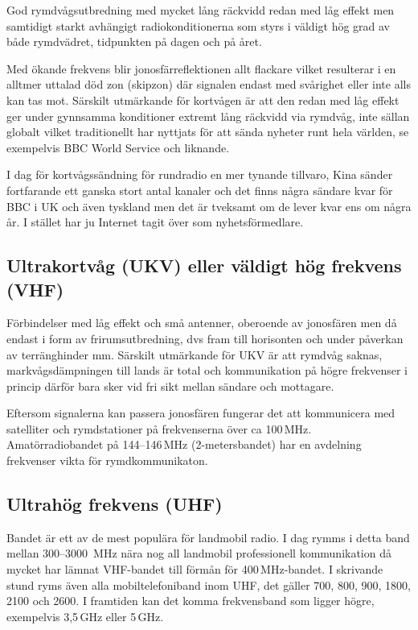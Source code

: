 God rymdvågsutbredning med mycket lång räckvidd redan med låg effekt men
samtidigt starkt avhängigt radiokonditionerna som styrs i väldigt hög grad av
både rymdvädret, tidpunkten på dagen och på året.

Med ökande frekvens blir jonosfärreflektionen allt flackare vilket resulterar
i en alltmer uttalad död zon (skipzon) där signalen endast med svårighet eller
inte alls kan tas mot. Särskilt utmärkande för kortvågen är att den redan med
låg effekt ger under gynnsamma konditioner extremt lång räckvidd via rymdvåg,
inte sällan globalt vilket traditionellt har nyttjats för att sända nyheter
runt hela världen, se exempelvis BBC World Service och liknande.

I dag för kortvågssändning för rundradio en mer tynande tillvaro, Kina sänder
fortfarande ett ganska stort antal kanaler och det finns några sändare kvar
för BBC i UK och även tyskland men det är tveksamt om de lever kvar ens om
några år. I stället har ju Internet tagit över som nyhetsförmedlare.

\subsection{Ultrakortvåg (UKV) eller väldigt hög frekvens (VHF)}

Förbindelser med låg effekt och små antenner, oberoende av jonosfären men då
endast i form av frirumsutbredning, dvs fram till horisonten och under
påverkan av terränghinder mm. Särskilt utmärkande för UKV är att rymdvåg
saknas, markvågsdämpningen till lands är total och kommunikation på högre
frekvenser i princip därför bara sker vid fri sikt mellan sändare och
mottagare.

Eftersom signalerna kan passera jonosfären fungerar det att kommunicera med
satelliter och rymdstationer på frekvenserna över ca 100\,MHz.
Amatörradiobandet på 144--146\,MHz (2-metersbandet) har en avdelning
frekvenser vikta för rymdkommunikaton.

\subsection{Ultrahög frekvens (UHF)}

Bandet är ett av de mest populära för landmobil radio. I dag rymms i detta
band mellan 300--3000\- \,MHz nära nog all landmobil professionell
kommunikation då mycket har lämnat VHF-bandet till förmån för 400\,MHz-bandet.
I skrivande stund ryms även alla mobiltelefoniband inom UHF, det gäller 700,
800, 900, 1800, 2100 och 2600. I framtiden kan det komma frekvensband som
ligger högre, exempelvis 3,5\,GHz eller 5\,GHz.

